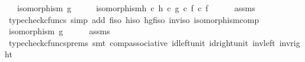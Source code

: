 \begin{isabellebody}
\ \ \ {\isachardoublequoteopen}isomorphism\ g{\isachardoublequoteclose}\isanewline
%
\isadelimproof
%
\endisadelimproof
%
\isatagproof
{}\isamarkupfalse%
\ {\isacharminus}{\kern0pt}\isanewline
\ \ \isamarkupfalse%
\ {\isachardoublequoteopen}isomorphism{\isacharparenleft}{\kern0pt}h\isactrlbold {\isasyminverse}\ {\isasymcirc}\isactrlsub c\ {\isacharparenleft}{\kern0pt}h\ {\isasymcirc}\isactrlsub c\ g\ {\isasymcirc}\isactrlsub c\ f{\isacharparenright}{\kern0pt}\ {\isasymcirc}\isactrlsub c\ f\isactrlbold {\isasyminverse}{\isacharparenright}{\kern0pt}{\isachardoublequoteclose}\isanewline
\ \ \ \ \isamarkupfalse%
\ assms\ \isamarkupfalse%
\ {\isacharparenleft}{\kern0pt}typecheck{\isacharunderscore}{\kern0pt}cfuncs{\isacharcomma}{\kern0pt}\ simp\ add{\isacharcolon}{\kern0pt}\ f{\isacharunderscore}{\kern0pt}iso\ h{\isacharunderscore}{\kern0pt}iso\ hgf{\isacharunderscore}{\kern0pt}iso\ inv{\isacharunderscore}{\kern0pt}iso\ isomorphism{\isacharunderscore}{\kern0pt}comp{\isacharprime}{\kern0pt}{\isacharparenright}{\kern0pt}\isanewline
\ \ \isamarkupfalse%
\ \isamarkupfalse%
\ {\isachardoublequoteopen}isomorphism\ g{\isachardoublequoteclose}\isanewline
\ \ \ \ \isamarkupfalse%
\ assms\ \isamarkupfalse%
\ {\isacharparenleft}{\kern0pt}typecheck{\isacharunderscore}{\kern0pt}cfuncs{\isacharunderscore}{\kern0pt}prems{\isacharcomma}{\kern0pt}\ smt\ comp{\isacharunderscore}{\kern0pt}associative{}\ id{\isacharunderscore}{\kern0pt}left{\isacharunderscore}{\kern0pt}unit{}\ id{\isacharunderscore}{\kern0pt}right{\isacharunderscore}{\kern0pt}unit{}\ inv{\isacharunderscore}{\kern0pt}left\ inv{\isacharunderscore}{\kern0pt}right{\isacharparenright}{\kern0pt}\isanewline
{}\isamarkupfalse%
%
\endisatagproof
{\isafoldproof}%
%
\isadelimproof
\isanewline
%
\endisadelimproof
%
\isadelimtheory
\isanewline
%
\endisadelimtheory
%
\isatagtheory
{}\isamarkupfalse%
%
\endisatagtheory
{\isafoldtheory}%
%
\isadelimtheory
%
\endisadelimtheory
%
\end{isabellebody}%
\endinput
